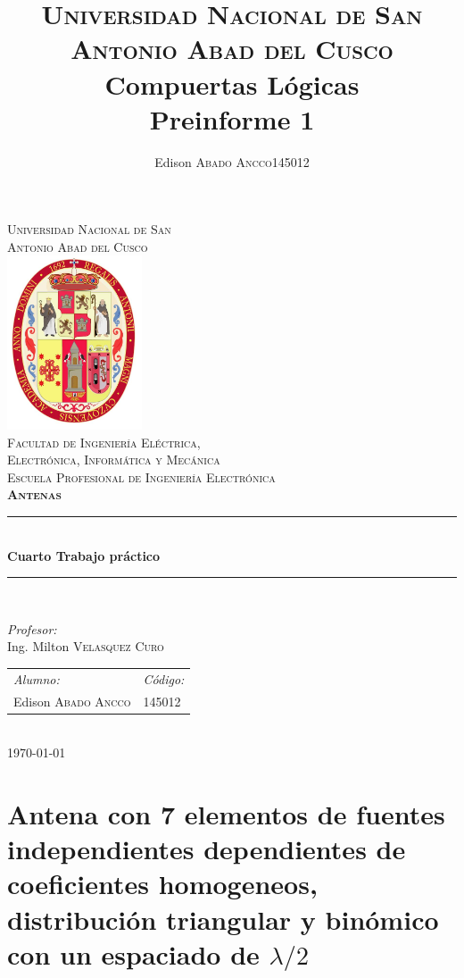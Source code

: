 \documentclass[11pt]{book}
\title{
	\textsc{Universidad Nacional de San Antonio Abad del Cusco}\\
	\textbf{Compuertas Lógicas}\\
	Preinforme 1}
\author{
	\begin{tabular}{lr}
		Edison \textsc{Abado Ancco} & 145012 \\
	\end{tabular}
}
\begin{document}
	
\begin{titlepage}
	\newcommand{\HRule}{\rule{\linewidth}{0.5mm}} 
	\center
	\textsc{\LARGE  Universidad Nacional de San \\[0.2cm] Antonio Abad del Cusco}\\[1.5cm] 
	\includegraphics[width=4cm]{IMAGENES/escudo}\\[1cm]
	\textsc{\Large Facultad de Ingeniería Eléctrica, \\ Electrónica, Informática y Mecánica}\\[0.5cm] 
	\textsc{\large Escuela Profesional de Ingeniería Electrónica}\\[0.5cm]
	\textsc{\Large \textbf{Antenas}}\\[0.5cm] 
	\HRule \\[0.4cm]
	{ \huge \bfseries Cuarto Trabajo práctico}\\[0.4cm] 
	\HRule \\[1.5cm]
	\begin{minipage}{\textwidth}
		\center 
		
		\emph{Profesor:} \\
		Ing. Milton \textsc{Velasquez Curo} \\[1cm]
		
		\begin{tabular}{ll}
			\emph{Alumno:} & \emph{Código:}\\
			Edison \textsc{Abado Ancco} & 145012 \\
		\end{tabular}
	\end{minipage}\\[2cm]
	\today
\end{titlepage}


\newpage


\chapter{Antena con 7 elementos de fuentes independientes dependientes de coeficientes homogeneos, distribución triangular y binómico con un espaciado de $\lambda/2$}
\end{document}

